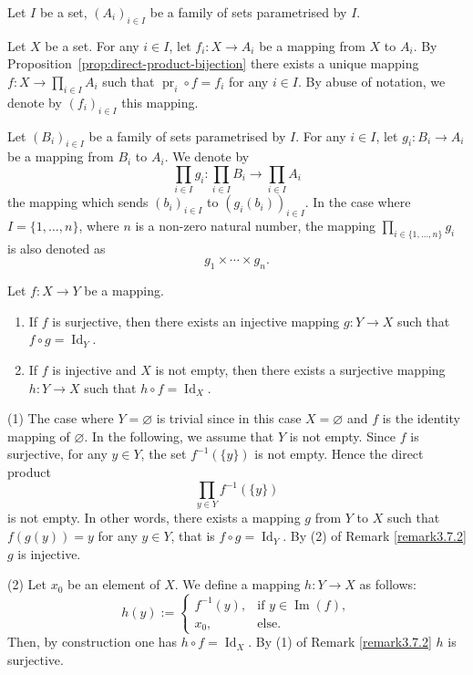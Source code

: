\begin{notationenv}
\label{not:direct-product-mappings}
Let $I$ be a set,  $(A_i)_{i \in I}$ be a family of sets parametrised by $I$.

Let $X$ be a set. For any $i \in I$,  let $f_i : X \to A_i$ be a mapping from $X$ to $A_i$. By Proposition~\ref{prop:direct-product-bijection} there exists a unique mapping $f : X \to \prod_{i \in I} A_i$ such that $\operatorname{pr}_i \circ f = f_i$ for any $i \in I$. By abuse of notation,  we denote by $(f_i)_{i \in I}$ this mapping.

Let $(B_i)_{i \in I}$ be a family of sets parametrised by $I$. For any $i \in I$,  let $g_i : B_i \to A_i$ be a mapping from $B_i$ to $A_i$. We denote by
\[
\prod_{i \in I} g_i : \prod_{i \in I} B_i \longrightarrow \prod_{i \in I} A_i
\]
the mapping which sends $(b_i)_{i \in I}$ to $(g_i(b_i))_{i \in I}$. In the case where $I = \{1,  \ldots,  n\}$,  where $n$ is a non-zero natural number,  the mapping $\prod_{i \in \{1,  \ldots,  n\}} g_i$ is also denoted as
\[
g_1 \times \cdots \times g_n.
\]
\end{notationenv}

\begin{propositionenv}
\label{prop:direct-product-factorization}
Let $f : X \to Y$ be a mapping.
\begin{enumerate}
    \item[(1)] If $f$ is surjective,  then there exists an injective mapping $g : Y \to X$ such that $f \circ g = \operatorname{Id}_Y$.
    \item[(2)] If $f$ is injective and $X$ is not empty,  then there exists a surjective mapping $h : Y \to X$ such that $h \circ f = \operatorname{Id}_X$.
\end{enumerate}
\end{propositionenv}

\begin{proofenv}
(1) The case where $Y = \varnothing$ is trivial since in this case $X = \varnothing$ and $f$ is the identity mapping of $\varnothing$. In the following,  we assume that $Y$ is not empty. Since $f$ is surjective,  for any $y \in Y$,  the set $f^{-1}(\{y\})$ is not empty. Hence the direct product
\[
\prod_{y \in Y} f^{-1}(\{y\})
\]
is not empty. In other words,  there exists a mapping $g$ from $Y$ to $X$ such that $f(g(y)) = y$ for any $y \in Y$,  that is $f \circ g = \operatorname{Id}_Y$. By (2) of Remark \ref{remark3.7.2} $g$ is injective.

(2) Let $x_0$ be an element of $X$. We define a mapping $h : Y \to X$ as follows:
\[
h(y) := 
\begin{cases}
f^{-1}(y),  & \text{if } y \in \operatorname{Im}(f),  \\
x_0,  & \text{else}.
\end{cases}
\]
Then,  by construction one has $h \circ f = \operatorname{Id}_X$. 
\newline
By (1) of Remark \ref{remark3.7.2} $h$ is surjective.
\end{proofenv}

